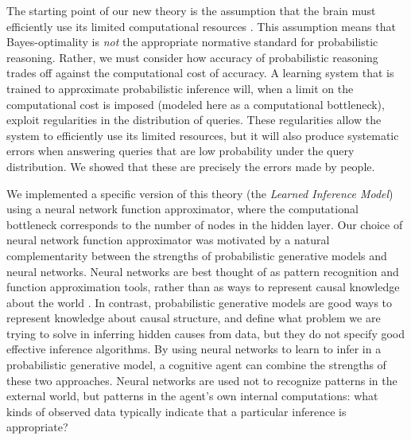 The starting point of our new theory is the assumption that the brain must efficiently use its limited computational resources \citep{gershman2015computational,lieder2019resource}. This assumption means that Bayes-optimality is \emph{not} the appropriate normative standard for probabilistic reasoning. Rather, we must consider how accuracy of probabilistic reasoning trades off against the computational cost of accuracy. A learning system that is trained to approximate probabilistic inference will, when a limit on the computational cost is imposed  (modeled here as a computational bottleneck), exploit regularities in the distribution of queries. These regularities allow the system to efficiently use its limited resources, but it will also produce systematic errors when answering queries that are low probability under the query distribution. We showed that these are precisely the errors made by people.

We implemented a specific version of this theory (the \emph{Learned Inference Model}) using a neural network function approximator, where the computational bottleneck corresponds to the number of nodes in the hidden layer. Our choice of neural network function approximator was motivated by a natural complementarity between the strengths of probabilistic generative models and neural networks. Neural networks are best thought of as pattern recognition and function approximation tools, rather than as ways to represent causal knowledge about the world \citep{lake2017building}. In contrast, probabilistic generative models are good ways to represent knowledge about causal structure, and define what problem we are trying to solve in inferring hidden causes from data, but they do not specify good effective inference algorithms. By using neural networks to learn to infer in a probabilistic generative model, a cognitive agent can combine the strengths of these two approaches. Neural networks are used not to recognize patterns in the external world, but patterns in the agent's own internal computations: what kinds of observed data typically indicate that a particular inference is appropriate?

